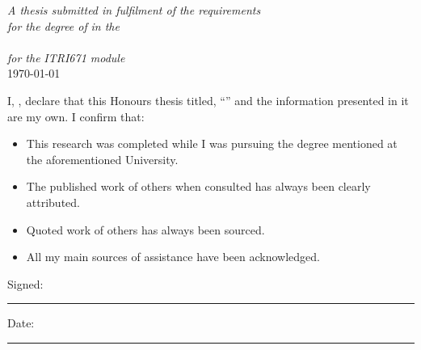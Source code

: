 \documentclass[
12pt, %
english, %
doublespacing, %
headsepline, %
]{MastersDoctoralThesis} %
\begin{document}
\begin{titlepage}
\begin{center}

\large \textit{A thesis submitted in fulfilment of the requirements\\ for the degree of \degreename} %
\textit{in the}\\[0.4cm]
\deptname\\[1cm] %
\large \textit{for the}
\large \textit{ITRI671 module}\\
{\large \today}\\[4cm] %
 
\end{center}
\end{titlepage}


\begin{declaration}
\addchaptertocentry{\authorshipname} %
\noindent I, \authorname, declare that this Honours thesis titled, \enquote{\ttitle} and the information presented in it are my own. I confirm that:

\begin{itemize} 
\item This research was completed while I was pursuing the degree mentioned at the aforementioned University.
\item The published work of others when consulted has always been clearly attributed.
\item Quoted work of others has always been sourced.
\item All my main sources of assistance have been acknowledged.\\
\end{itemize}
 
\noindent Signed:\\
\rule[0.5em]{25em}{0.5pt} %
 
\noindent Date:\\
\rule[0.5em]{25em}{0.5pt} %
\end{declaration}

\cleardoublepage

\end{document}
